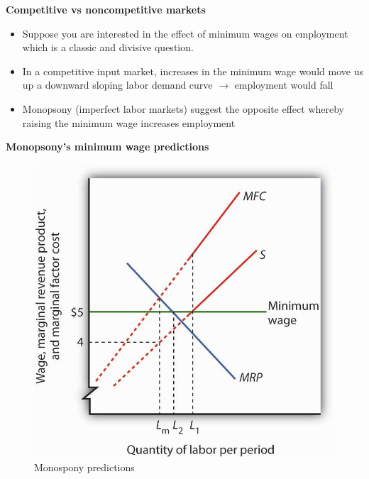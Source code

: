 \documentclass[notes=show]{beamer}
\begin{document}
\begin{frame}[plain]
\begin{center}
\textbf{Competitive vs noncompetitive markets}
\end{center}

\begin{itemize}
	\item Suppose you are interested in the effect of minimum wages on employment which is a classic and divisive question.
	\item In a competitive input market, increases in the minimum wage would move us up a downward sloping labor demand curve $\rightarrow$ employment would fall
	\item Monopsony (imperfect labor markets) suggest the opposite effect whereby raising the minimum wage increases employment
\end{itemize}

\end{frame}

\begin{frame}[plain]

\begin{center}
\textbf{Monopsony's minimum wage predictions}
\end{center}

\begin{figure}
\includegraphics[scale=0.3]{./lecture_includes/monopsony.jpeg}
\caption{Monospony predictions}
\end{figure}

\end{frame}
\end{document}
